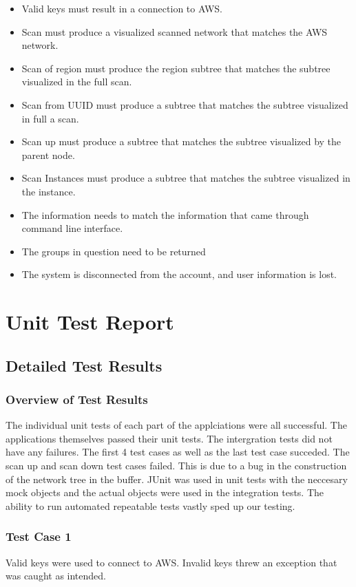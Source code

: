 \documentclass[hidelinks,a4paper,12pt]{article}
\begin{document}
\begin{itemize}
\item Valid keys must result in a connection to AWS.
\item Scan must produce a visualized scanned network that matches the AWS network.
\item Scan of region must produce the region subtree that matches the subtree visualized in the full scan.
\item Scan from UUID must produce a subtree that matches the subtree visualized in full a scan.
\item Scan up must produce a subtree that matches the subtree visualized by the parent node.
\item Scan Instances must produce a subtree that matches the subtree visualized in the instance.
\item The information needs to match the information that came through command line interface.
\item The groups in question need to be returned
\item The system is disconnected from the account, and user information is lost. 
\end{itemize}
\newpage
\section{Unit Test Report}

\subsection{Detailed Test Results}
\subsubsection{Overview of Test Results}
The individual unit tests of each part of the applciations were all successful. The applications themselves passed their unit tests. The intergration tests did not have any failures. The first 4  test cases as well as the last test case succeded. The scan up and scan down test cases failed. This is due to a bug in the construction of the network tree in the buffer. JUnit was used in unit tests with the neccesary mock objects and the actual objects were used in the integration tests. The ability to run automated repeatable tests vastly sped up our testing.
\subsubsection{Test Case 1}
Valid keys were used to connect to AWS. Invalid keys threw an exception that was caught as intended.
\end{document}

